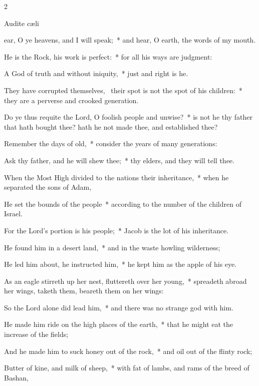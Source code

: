 \begin{multicols}{2}
\begin{inhead}
Audite c{\ae}li
\end{inhead}

 ear, O ye heavens, and I will speak;~* and hear, O earth, the words of my mouth.\par
{}
He is the Rock, his work is perfect:~* for all his ways are judgment:\par
A God of truth and without iniquity,~* just and right is he.\par
They have corrupted themselves,~{\dag} their spot is not the spot of his children:~* they are a perverse and crooked generation.\par
Do ye thus requite the Lord, O foolish people and unwise?~* is not he thy father that hath bought thee? hath he not made thee, and established thee?\par
Remember the days of old,~* consider the years of many generations:\par
Ask thy father, and he will shew thee;~* thy elders, and they will tell thee.\par
When the Most High divided to the nations their inheritance,~* when he separated the sons of Adam,\par
He set the bounds of the people~* according to the number of the children of Israel.\par
For the Lord's portion is his people;~* Jacob is the lot of his inheritance.\par
He found him in a desert land,~* and in the waste howling wilderness;\par
He led him about, he instructed him,~* he kept him as the apple of his eye.\par
As an eagle stirreth up her nest, fluttereth over her young,~* spreadeth abroad her wings, taketh them, beareth them on her wings:\par
So the Lord alone did lead him,~* and there was no strange god with him.\par
He made him ride on the high places of the earth,~* that he might eat the increase of the fields;\par
And he made him to suck honey out of the rock,~* and oil out of the flinty rock;\par
Butter of kine, and milk of sheep,~* with fat of lambs, and rams of the breed of Bashan,\par

\end{multicols}
